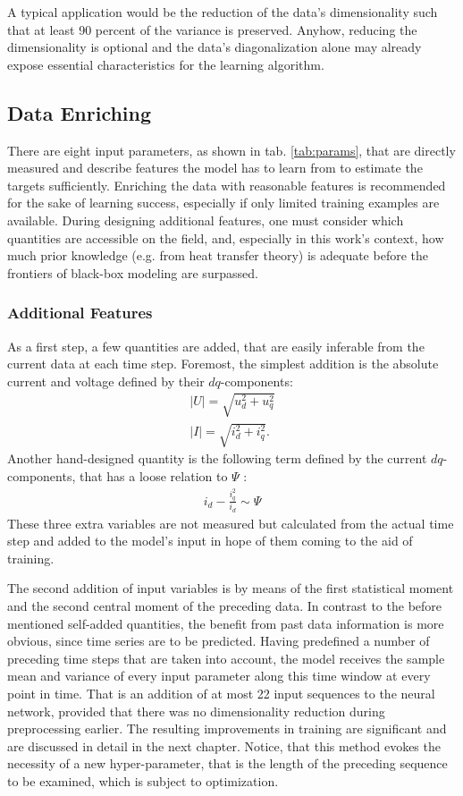 A typical application would be the reduction of the data's dimensionality such that at least 90 percent of the variance is preserved.
Anyhow, reducing the dimensionality is optional and the data's diagonalization alone may already expose essential characteristics for the learning algorithm.

\subsection{Data Enriching}
\label{ssec:data_enriching}
There are eight input parameters, as shown in tab. \ref{tab:params}, that are directly measured and describe features the model has to learn from to estimate the targets sufficiently.
Enriching the data with reasonable features is recommended \cite{Domingo2012} for the sake of learning success, especially if only limited training examples are available.
During designing additional features, one must consider which quantities are accessible on the field, and, especially in this work's context, how much prior knowledge (e.g. from heat transfer theory) is adequate before the frontiers of black-box modeling are surpassed.

\subsubsection{Additional Features}
As a first step, a few quantities are added, that are easily inferable from the current data at each time step.
Foremost, the simplest addition is the absolute current and voltage defined by their $dq$-components:
\begin{align}
	|U| = \sqrt{u_{d}^2 + u_{q}^2} \\
	|I| = \sqrt{i_{d}^2 + i_{q}^2}.
\end{align}
Another hand-designed quantity is the following term defined by the current $dq$-components, that has a loose relation to $\Psi$ \cite{LeVa2014}:
\begin{align}
	i_d - \frac{i_q^2}{i_d} \sim \Psi
\end{align}
These three extra variables are not measured but calculated from the actual time step and added to the model's input in hope of them coming to the aid of training.

The second addition of input variables is by means of the first statistical moment and the second central moment of the preceding data.
In contrast to the before mentioned self-added quantities, the benefit from past data information is more obvious, since time series are to be predicted.
Having predefined a number of preceding time steps that are taken into account, the model receives the sample mean and variance of every input parameter along this time window at every point in time.
That is an addition of at most 22 input sequences to the neural network, provided that there was no dimensionality reduction during preprocessing earlier.
The resulting improvements in training are significant and are discussed in detail in the next chapter.
Notice, that this method evokes the necessity of a new hyper-parameter, that is the length of the preceding sequence to be examined, which is subject to optimization.

